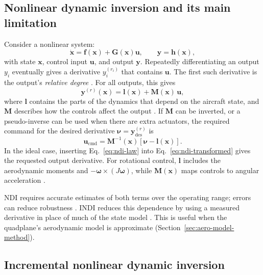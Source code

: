 \documentclass{article}
\begin{document}
\subsection{Nonlinear dynamic inversion and its main limitation}
\label{sec:ndi-theory}
Consider a nonlinear system:
\begin{equation}
    \dot{\mathbf{x}}=\mathbf{f}(\mathbf{x})+\mathbf{G}(\mathbf{x})\mathbf{u},\qquad \mathbf{y}=\mathbf{h}(\mathbf{x}),
    \label{eq:ndi-system}
\end{equation}
with state $\mathbf{x}$, control input $\mathbf{u}$, and output $\mathbf{y}$. Repeatedly differentiating an output $y_i$ eventually gives a derivative $y_i^{(r_i)}$ that contains $\mathbf{u}$. The first such derivative is the output's \emph{relative degree} \citep{lombaerts2019,steinertPart1_2025}. For all outputs, this gives
\begin{equation}
    \mathbf{y}^{(r)}(\mathbf{x})=\mathbf{l}(\mathbf{x})+\mathbf{M}(\mathbf{x})\,\mathbf{u},
    \label{eq:ndi-transformed}
\end{equation}
where $\mathbf{l}$ contains the parts of the dynamics that depend on the aircraft state, and $\mathbf{M}$ describes how the controls affect the output \citep{lombaerts2019}. If $\mathbf{M}$ can be inverted, or a pseudo-inverse can be used when there are extra actuators, the required command for the desired derivative $\boldsymbol{\nu}=\mathbf{y}^{(r)}_{\mathrm{des}}$ is
\begin{equation}
    \mathbf{u}_{\mathrm{cmd}}=\mathbf{M}^{-1}(\mathbf{x})\left[\boldsymbol{\nu}-\mathbf{l}(\mathbf{x})\right].
    \label{eq:ndi-law}
\end{equation}
In the ideal case, inserting Eq.~\eqref{eq:ndi-law} into Eq.~\eqref{eq:ndi-transformed} gives the requested output derivative. For rotational control, $\mathbf{l}$ includes the aerodynamic moments and $-\boldsymbol{\omega}\times(J\boldsymbol{\omega})$, while $\mathbf{M}(\mathbf{x})$ maps controls to angular acceleration \citep{lombaerts2019}.

NDI requires accurate estimates of both terms over the operating range; errors can reduce robustness \citep{snell1992,buffington1999}. INDI reduces this dependence by using a measured derivative in place of much of the state model \citep{steinertPart2_2025}. This is useful when the quadplane's aerodynamic model is approximate (Section~\ref{sec:aero-model-method}).

\subsection{Incremental nonlinear dynamic inversion}
\label{sec:indi-theory}
\end{document}
